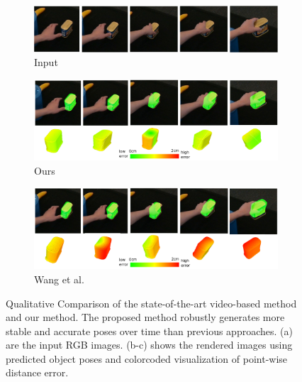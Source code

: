 \begin{figure}[!ht]
    \begin{subfigure}{0.98\textwidth}
        \includegraphics[width=\linewidth]{figs/1_rgb}
        \caption{Input}
    \end{subfigure}
    \hfill
    \begin{subfigure}{0.98\textwidth}
        \includegraphics[width=\linewidth]{figs/1_1}
        \caption{Ours}
    \end{subfigure}
    \hfill
    \begin{subfigure}{0.98\textwidth}
        \includegraphics[width=\linewidth]{figs/1_2}
        \caption{Wang et al. \cite{wang2023deep}}
    \end{subfigure}
    \caption{Qualitative Comparison of the state-of-the-art video-based method \cite{wang2023deep} and our method. The proposed method robustly generates more stable and accurate poses over time than previous approaches. (a) are the input RGB images. (b-c) shows the rendered images using predicted object poses and colorcoded visualization of point-wise distance error.}
    \label{fig:result1}
\end{figure}

